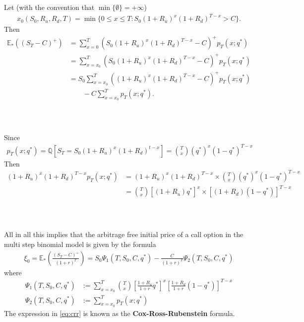\documentclass{beamer}
\numberwithin{equation}{section}
\begin{document}
\begin{frame}\frametitle{{\normalsize \secname} \\ {\large \subsecname}}
    Let (with the convention that $\min\{ \emptyset \} = + \infty$)
    \begingroup
    \footnotesize
    \begin{align}
        x_0(S_0, R_u, R_d, T) = \min\{ 0 \leq x \leq T : S_0(1 + R_u)^x(1+R_d)^{T-x} > C\}.
    \end{align}
    \endgroup
    Then
    \begingroup
    \footnotesize 
    \begin{align}
        \mathbb{E}_*\left( (S_T - C)^+\right) &= \sum_{x=0}^T \left( S_0(1+R_u)^x(1 + R_d)^{T-x}  - C \right)^+ p_T(x; q^*)\\
        &= \sum_{x=x_0}^T \left( S_0(1+R_u)^x(1 + R_d)^{T-x}  - C \right)^+ p_T(x; q^*)\\
        &= S_0 \sum_{x=x_0}^T \left((1+R_u)^x(1 + R_d)^{T-x}  - C \right)^+ p_T(x; q^*)
        \\ &\qquad 
        - C \sum_{x=x_0}^T p_T (x; q^*). 
    \end{align}
    \endgroup
\end{frame}

\begin{frame}\frametitle{{\normalsize \secname} \\ {\large \subsecname}}
    Since
    \begingroup
    \footnotesize 
    \begin{align}
        p_T(x; q^*) = \mathbb{Q} \left[ S_T = S_0(1 + R_u)^x(1+R_d)^{t-x} \right] = \binom{T}{x}(q^*)^x(1-q^*)^{T-x}
    \end{align}
    \endgroup
    Then
    \begingroup
    \footnotesize
    \begin{align}
    (1+R_u)^x(1+R_d)^{T-x} p_T(x; q^*) &= (1+R_u)^x(1+R_d)^{T-x} \times \binom{T}{x} (q^*)^x(1-q^*)^{T-x}\\
    &= \binom{T}{x} [(1 + R_u)q^*]^x \times [(1+R_d)(1-q^*)]^{T-x}
    \end{align}
    \endgroup
\end{frame}

\begin{frame}\frametitle{{\normalsize \secname} \\ {\large \subsecname}}
    All in all this implies that the arbitrage free initial price of a call option in the multi step binomial model is given by the formula
    \begingroup
    \small
    \begin{align}\label{eq:crr}
        \xi_0 = \mathbb{E}_* \left( \frac{(S_T - C)^+}{(1+r)^T} \right) = S_0 \Psi_1(T, S_0, C, q^*) - \frac{C}{(1+r)^T} \Psi_2(T, S_0, C, q^*)
    \end{align}
    \endgroup
    where
    \begingroup
    \small
    \begin{align}
        \Psi_1 (T, S_0, C, q^*) &:= \sum_{x = x_0}^T \binom{T}{x} \left[ \frac{1 + R_u}{1+r} q^* \right]^x\left[ \frac{1+R_d}{1+r}(1 - q^*) \right]^{T-x}\\
        \Psi_2 (T, S_0, C, q^*) &:= \sum_{x = x_0}^T p_T(x; q^*)
    \end{align}
    \endgroup
    The expression in \eqref{eq:crr} is known as the \textbf{Cox-Ross-Rubenstein} formula.
\end{frame}
\end{document}
